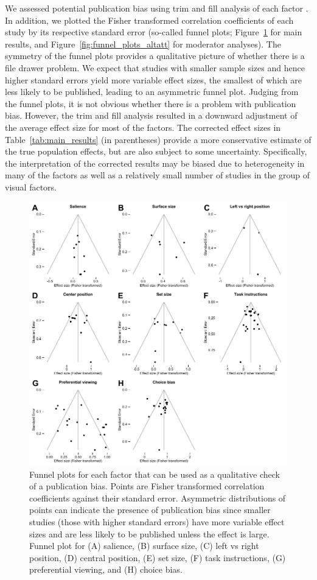 \documentclass[english,natbib,man,floatsintext]{apa6}
\begin{document}
We assessed potential publication bias using trim and fill analysis of each factor \citep{duval2000trim}. In addition, we plotted the  Fisher transformed correlation coefficients of each study by its respective standard error (so-called funnel plots; Figure~\ref{fig:funnel_plots} for main results, and Figure~\ref{fig:funnel_plots_altatt} for moderator analyses). The symmetry of the funnel plots provides a qualitative picture of whether there is a file drawer problem. We expect that studies with smaller sample sizes and hence higher standard errors yield more variable effect sizes, the smallest of which are less likely to be published, leading to an asymmetric funnel plot. Judging from the funnel plots, it is not obvious whether there is a problem with publication bias. However, the trim and fill analysis resulted in a downward adjustment of the average effect size for most of the factors. The corrected effect sizes in Table~\ref{tab:main_results} (in parentheses) provide a more conservative estimate of the true population effects, but are also subject to some uncertainty. Specifically, the interpretation of the corrected results may be biased due to heterogeneity in many of the factors as well as a relatively small number of studies in the group of visual factors. 


\begin{figure}[h]
\includegraphics{funnel_plots}
\centering
\caption{Funnel plots for each factor that can be used as a qualitative check of a publication bias. Points are Fisher transformed correlation coefficients against their standard error. Asymmetric distributions of points can indicate the presence of publication bias since smaller studies (those with higher standard errors) have more variable effect sizes and are less likely to be published unless the effect is large. Funnel plot for (A) salience, (B) surface size, (C) left vs right position, (D) central position, (E) set size, (F) task instructions, (G) preferential viewing, and (H) choice bias.}
\label{fig:funnel_plots}
\end{figure}
\end{document}
